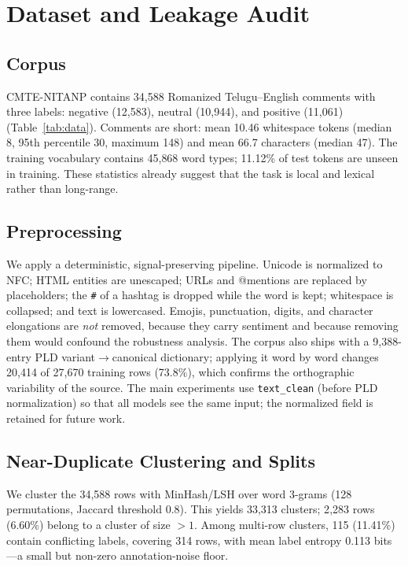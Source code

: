 \documentclass[10pt,journal]{IEEEtran}
\begin{document}
\section{Dataset and Leakage Audit}
\subsection{Corpus}
CMTE-NITANP contains 34{,}588 Romanized Telugu--English comments with three labels: negative (12{,}583), neutral (10{,}944), and positive (11{,}061) (Table~\ref{tab:data}). Comments are short: mean 10.46 whitespace tokens (median 8, 95th percentile 30, maximum 148) and mean 66.7 characters (median 47). The training vocabulary contains 45{,}868 word types; 11.12\% of test tokens are unseen in training. These statistics already suggest that the task is local and lexical rather than long-range.

\subsection{Preprocessing}
We apply a deterministic, signal-preserving pipeline. Unicode is normalized to NFC; HTML entities are unescaped; URLs and @mentions are replaced by placeholders; the \texttt{\#} of a hashtag is dropped while the word is kept; whitespace is collapsed; and text is lowercased. Emojis, punctuation, digits, and character elongations are \emph{not} removed, because they carry sentiment and because removing them would confound the robustness analysis. The corpus also ships with a 9{,}388-entry PLD variant$\rightarrow$canonical dictionary; applying it word by word changes 20{,}414 of 27{,}670 training rows (73.8\%), which confirms the orthographic variability of the source. The main experiments use \texttt{text\_clean} (before PLD normalization) so that all models see the same input; the normalized field is retained for future work.

\subsection{Near-Duplicate Clustering and Splits}
We cluster the 34{,}588 rows with MinHash/LSH over word 3-grams (128 permutations, Jaccard threshold 0.8). This yields 33{,}313 clusters; 2{,}283 rows (6.60\%) belong to a cluster of size $>1$. Among multi-row clusters, 115 (11.41\%) contain conflicting labels, covering 314 rows, with mean label entropy 0.113 bits---a small but non-zero annotation-noise floor.
\end{document}

